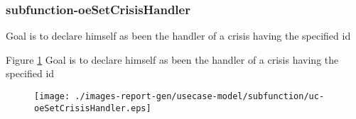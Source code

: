 \subsubsection{subfunction-oeSetCrisisHandler}

\label{RE-use-case-oeSetCrisisHandler}


Goal is to declare himself as been the handler of a crisis having the specified id		  


\begin{usecase}
  









\end{usecase} 

Figure \ref{fig:lu.uni.lassy.excalibur.myproject-RE-UCD-uc-oeSetCrisisHandler}
Goal is to declare himself as been the handler of a crisis having the specified id

\begin{figure}[htbp]
\begin{center}

\texttt{[image: ./images-report-gen/usecase-model/subfunction/uc-oeSetCrisisHandler.eps]}
\end{center}
\caption[lu.uni.lassy.excalibur.myproject Use Case Diagram: uc-oeSetCrisisHandler]{}
\label{fig:lu.uni.lassy.excalibur.myproject-RE-UCD-uc-oeSetCrisisHandler}
\end{figure}
\vspace{0.5cm}
